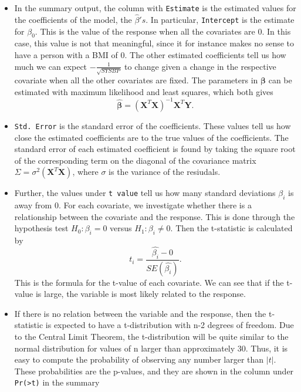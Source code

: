 \documentclass[]{article}
\begin{document}
\begin{itemize}
\item
  In the summary output, the column with \texttt{Estimate} is the
  estimated values for the coefficients of the model, the
  \(\hat{\beta}'s\). In particular, \texttt{Intercept} is the estimate
  for \(\beta_0\). This is the value of the response when all the
  covariates are 0. In this case, this value is not that meaningful,
  since it for instance makes no sense to have a person with a BMI of 0.
  The other estimated coefficients tell us how much we can expect
  \(-\frac{1}{\sqrt{SYSBP}}\) to change given a change in the respective
  covariate when all the other covariates are fixed. The parameters in
  \(\boldsymbol{\beta}\) can be estimated with maximum likelihood and
  least squares, which both gives
  \[\boldsymbol{\hat{\beta}}=(\boldsymbol{X}^T\boldsymbol{X})^{-1}\boldsymbol{X}^T\boldsymbol{Y}.\]
\item
  \texttt{Std.\ Error} is the standard error of the coefficients. These
  values tell us how close the estimated coefficients are to the true
  values of the coefficients. The standard error of each estimated
  coefficient is found by taking the square root of the corresponding
  term on the diagonal of the covariance matrix
  \(\Sigma = \sigma^2(\boldsymbol{X}^T\boldsymbol{X})\), where
  \(\sigma\) is the variance of the resiudals.
\item
  Further, the values under \texttt{t\ value} tell us how many standard
  deviations \(\beta_i\) is away from 0. For each covariate, we
  investigate whether there is a relationship between the covariate and
  the response. This is done through the hypothesis test
  \(H_0: \beta_i = 0\) versus \(H_1: \beta_i \neq 0\). Then the
  t-statistic is calculated by
  \[t_i = \frac{\hat{\beta_i}-0}{SE(\hat{\beta_i})}.\] This is the
  formula for the t-value of each covariate. We can see that if the
  t-value is large, the variable is most likely related to the response.
\item
  If there is no relation between the variable and the response, then
  the t-statistic is expected to have a t-distribution with n-2 degrees
  of freedom. Due to the Central Limit Theorem, the t-distribution will
  be quite similar to the normal distribution for values of n larger
  than approximately 30. Thus, it is easy to compute the probability of
  observing any number larger than \(|t|\). These probabilities are the
  p-values, and they are shown in the column under
  \texttt{Pr(\textgreater{}\textbar{}t\textbar{})} in the summary

\end{itemize}
\end{document}
